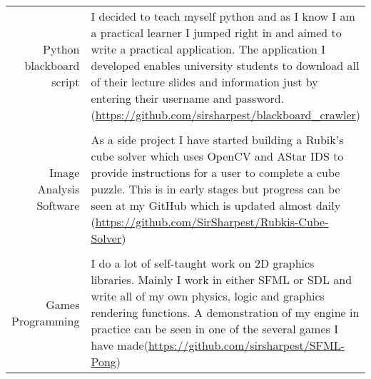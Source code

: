 \documentclass[a4paper,10pt]{article}
\begin{document}
\begin{tabular}{r|p{11cm}}
  Python blackboard script& I decided to teach myself python and as I know I am a practical learner I jumped right in and aimed to write a practical application. The application I developed enables university students to download all of their lecture slides and information just by entering their username and password.(\href{https://github.com/sirsharpest/blackboard\_crawler}{https://github.com/sirsharpest/blackboard\_crawler})\\
  \\
  Image Analysis Software& As a side project I have started building a Rubik's cube solver which uses OpenCV and AStar IDS to provide instructions for a user to complete a cube puzzle. This is in early stages but progress can be seen at my GitHub which is updated almost daily (\href{https://github.com/SirSharpest/Rubkis-Cube-Solver}{https://github.com/SirSharpest/Rubkis-Cube-Solver})\\
  \\
  Games Programming& I do a lot of self-taught work on 2D graphics libraries. Mainly I work in either SFML or SDL and write all of my own physics, logic and graphics rendering functions. A demonstration of my engine in practice can be seen in one of the several games I have made(\href{https://github.com/sirsharpest/SFML-Pong}{https://github.com/sirsharpest/SFML-Pong})
\end{tabular}
\par 
\clearpage
\end{document}
